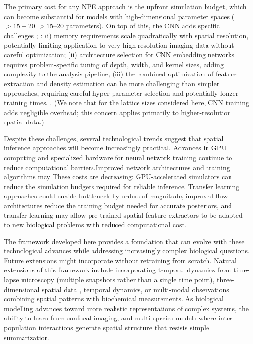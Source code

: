 \documentclass{article}
\providecommand{\DIFaddtex}[1]{{\protect\color{blue} \sf #1}} %
\providecommand{\DIFdeltex}[1]{{\protect\color{red} \scriptsize #1}} %
\providecommand{\DIFaddbegin}{} %
\providecommand{\DIFaddend}{} %
\providecommand{\DIFdelbegin}{} %
\providecommand{\DIFdelend}{} %
\providecommand{\DIFadd}[1]{\texorpdfstring{\DIFaddtex{#1}}{#1}} %
\providecommand{\DIFdel}[1]{\texorpdfstring{\DIFdeltex{#1}}{}} %
\newcommand{\DIFscaledelfig}{0.5}
\newlength{\DIFdelgraphicswidth} %
\newlength{\DIFdelgraphicsheight} %
\newcommand{\DIFaddincludegraphics}[2][]{{\color{blue}\fbox{\DIFOincludegraphics[#1]{#2}}}} %
\newcommand{\DIFdelincludegraphics}[2][]{%
\sbox{\DIFdelgraphicsbox}{\DIFOincludegraphics[#1]{#2}}%
\settoboxwidth{\DIFdelgraphicswidth}{\DIFdelgraphicsbox} %
\settoboxtotalheight{\DIFdelgraphicsheight}{\DIFdelgraphicsbox} %
\scalebox{\DIFscaledelfig}{%
\parbox[b]{\DIFdelgraphicswidth}{\usebox{\DIFdelgraphicsbox}\\[-\baselineskip] \rule{\DIFdelgraphicswidth}{0em}}\llap{\resizebox{\DIFdelgraphicswidth}{\DIFdelgraphicsheight}{%
\setlength{\unitlength}{\DIFdelgraphicswidth}%
\begin{picture}(1,1)%
\thicklines\linethickness{2pt} %
{\color[rgb]{1,0,0}\put(0,0){\framebox(1,1){}}}%
{\color[rgb]{1,0,0}\put(0,0){\line( 1,1){1}}}%
{\color[rgb]{1,0,0}\put(0,1){\line(1,-1){1}}}%
\end{picture}%
}\hspace*{3pt}}} %
} %
\DeclareRobustCommand{\DIFaddbegin}{\DIFOaddbegin \let\includegraphics\DIFaddincludegraphics} %
\DeclareRobustCommand{\DIFaddend}{\DIFOaddend \let\includegraphics\DIFOincludegraphics} %
\DeclareRobustCommand{\DIFdelbegin}{\DIFOdelbegin \let\includegraphics\DIFdelincludegraphics} %
\DeclareRobustCommand{\DIFdelend}{\DIFOaddend \let\includegraphics\DIFOincludegraphics} %
\begin{document}
\DIFdelend The primary cost for any NPE approach is the upfront simulation budget, which can become substantial for models with high-dimensional parameter spaces (\DIFdelbegin \DIFdel{$> 15-20$ }\DIFdelend \DIFaddbegin \DIFadd{$> 15$--$20$ }\DIFaddend parameters). On top of this, the CNN adds specific challenges\DIFdelbegin \DIFdel{; }\DIFdelend \DIFaddbegin \DIFadd{: }\DIFaddend (i) memory requirements scale quadratically with spatial resolution, potentially limiting application to very high-resolution imaging data without careful optimization; (ii) architecture selection for CNN embedding networks requires problem-specific tuning of depth, width, and kernel sizes, adding complexity to the analysis pipeline; (iii) the combined optimization of feature extraction and density estimation can be more challenging than simpler approaches, requiring careful hyper-parameter selection\DIFdelbegin \DIFdel{and potentially longer training times. }\DIFdelend \DIFaddbegin \DIFadd{. (We note that for the lattice sizes considered here, CNN training adds negligible overhead; this concern applies primarily to higher-resolution spatial data.)
}\DIFaddend 

\DIFdelbegin \DIFdel{Despite these challenges, several technological trends suggest that spatial inference approaches will become increasingly practical. Advances in GPU computing and specialized hardware for neural network training continue to reduce computational barriers.Improved network architectures and training algorithms may }\DIFdelend \DIFaddbegin \DIFadd{These costs are decreasing: GPU-accelerated simulators can }\DIFaddend reduce the simulation \DIFdelbegin \DIFdel{budgets required for reliable inference. Transfer learning approaches could enable }\DIFdelend \DIFaddbegin \DIFadd{bottleneck by orders of magnitude, improved flow architectures reduce the training budget needed for accurate posteriors, and transfer learning may allow }\DIFaddend pre-trained spatial feature extractors to be adapted to new biological problems \DIFdelbegin \DIFdel{with reduced computational cost. }%

\DIFdel{The framework developed here provides a foundation that can evolve with these technological advances while addressing increasingly complex biological questions. Future extensions might incorporate }\DIFdelend \DIFaddbegin \DIFadd{without retraining from scratch. Natural extensions of this framework include incorporating temporal dynamics from time-lapse microscopy (multiple snapshots rather than a single time point), }\DIFaddend three-dimensional spatial data \DIFdelbegin \DIFdel{, temporal dynamics, or multi-modal observations combining spatial patterns with biochemical measurements.
As biological modelling advances toward more realistic representations of complex systems, the ability to learn }\DIFdelend \DIFaddbegin \DIFadd{from confocal imaging, and multi-species models where inter-population interactions generate spatial structure that resists simple summarization.
}
\end{document}
